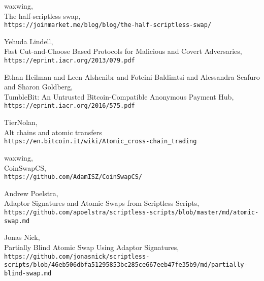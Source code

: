 \documentclass[12pt,a4paper]{article}
\begin{document}
\begin{tiny}
\begin{thebibliography}{9}
  waxwing, \\
  The half-scriptless swap, \\
  \texttt{https://joinmarket.me/blog/blog/the-half-scriptless-swap/}

  Yehuda Lindell, \\
  Fast Cut-and-Choose Based Protocols for Malicious and Covert Adversaries, \\
  \texttt{https://eprint.iacr.org/2013/079.pdf}

  Ethan Heilman and Leen Alshenibr and Foteini Baldimtsi and Alessandra Scafuro and Sharon Goldberg, \\
  TumbleBit: An Untrusted Bitcoin-Compatible Anonymous Payment Hub, \\
  \texttt{https://eprint.iacr.org/2016/575.pdf}

  TierNolan, \\
  Alt chains and atomic transfers \\
  \texttt{https://en.bitcoin.it/wiki/Atomic\_cross-chain\_trading}

  waxwing, \\
  CoinSwapCS, \\
  \texttt{https://github.com/AdamISZ/CoinSwapCS/}

  Andrew Poelstra, \\
  Adaptor Signatures and Atomic Swaps from Scriptless Scripts, \\
  \texttt{https://github.com/apoelstra/scriptless-scripts/blob/master/md/atomic-swap.md}

  Jonas Nick, \\
  Partially Blind Atomic Swap Using Adaptor Signatures, \\
  \texttt{https://github.com/jonasnick/scriptless-scripts/blob/46eb506dbfa51295853bc285ce667eeb47fe35b9/md/partially-blind-swap.md}
\end{thebibliography}
\end{tiny}
\end{document}
